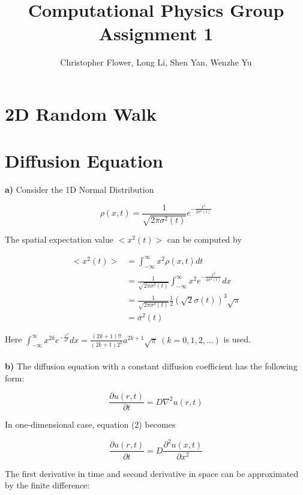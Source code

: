 \documentclass{article}
\begin{document}
\title{\textbf{Computational Physics Group Assignment 1}}
\author{Christopher Flower, Long Li, Shen Yan, Wenzhe Yu}
\maketitle

\section{2D Random Walk}

\section{Diffusion Equation}
\textbf{a)} Consider the 1D Normal Distribution

\begin{equation}
\rho(x,t) = \frac{1}{\sqrt{2\pi \sigma^2 (t)}} e^{-\frac{x^2}{2\sigma^2(t)}}
\end{equation}

The spatial expectation value $<x^2(t)>$ can be computed by

\begin{align*}
<x^2(t)> & = \int_{-\infty}^{\infty} x^2 \rho(x,t) dt \\
& = \frac{1}{\sqrt{2\pi \sigma^2 (t)}} \int_{-\infty}^{\infty} x^2 e^{-\frac{x^2}{2\sigma^2(t)}} dx \\
& = \frac{1}{\sqrt{2\pi \sigma^2 (t)}} \frac{1}{2} (\sqrt{2} \sigma(t))^3 \sqrt{\pi} \\
& = \sigma^2 (t)
\end{align*}

Here $\int_{-\infty}^{\infty} x^{2k} e^{-\frac{x^2}{a^2}} dx = \frac{(2k+1)!!}{(2k+1)2^k} a^{2k+1} \sqrt{\pi}\ (k=0,1,2,...)$ is used.\\
\\
\textbf{b)} The diffusion equation with a constant diffusion coefficient has the following form:

\begin{equation}
\frac{\partial u (r,t)}{\partial t} = D \nabla^2 u(r,t)
\end{equation}

In one-dimensional case, equation (2) becomes

\begin{equation}
\frac{\partial u (r,t)}{\partial t} = D \frac{\partial^2 u(x,t)}{\partial x^2}
\end{equation}

The first derivative in time and second derivative in space can be approximated by the finite difference:
\end{document}
